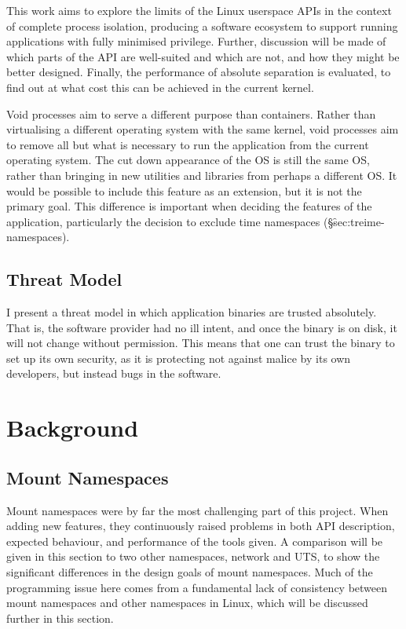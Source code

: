 \documentclass[sigplan]{acmart}
\begin{document}
This work aims to explore the limits of the Linux userspace APIs in the context of complete process isolation, producing a software ecosystem to support running applications with fully minimised privilege. Further, discussion will be made of which parts of the API are well-suited and which are not, and how they might be better designed. Finally, the performance of absolute separation is evaluated, to find out at what cost this can be achieved in the current kernel.

Void processes aim to serve a different purpose than containers. Rather than virtualising a different operating system with the same kernel, void processes aim to remove all but what is necessary to run the application from the current operating system. The cut down appearance of the OS is still the same OS, rather than bringing in new utilities and libraries from perhaps a different OS. It would be possible to include this feature as an extension, but it is not the primary goal. This difference is important when deciding the features of the application, particularly the decision to exclude time namespaces (§\f{sec:treime-namespaces}).

\subsection{Threat Model}
\label{section:threat-model}

I present a threat model in which application binaries are trusted absolutely. That is, the software provider had no ill intent, and once the binary is on disk, it will not change without permission. This means that one can trust the binary to set up its own security, as it is protecting not against malice by its own developers, but instead bugs in the software.


\section{Background}

\subsection{Mount Namespaces}

Mount namespaces were by far the most challenging part of this project. When adding new features, they continuously raised problems in both API description, expected behaviour, and performance of the tools given. A comparison will be given in this section to two other namespaces, network and UTS, to show the significant differences in the design goals of mount namespaces. Much of the programming issue here comes from a fundamental lack of consistency between mount namespaces and other namespaces in Linux, which will be discussed further in this section.
\end{document}
